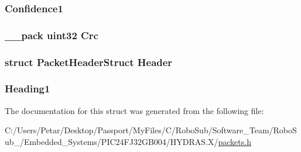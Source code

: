 \subsubsection[{Confidence1}]{ Confidence1}\label{struct_packet_pinger_heading1_get_struct_aa1ecb3c6ee2067686993dc4b6c60d44e}
\hypertarget{struct_packet_pinger_heading1_get_struct_a9ac0191cb1217dfb4164ca0e333de3ac}{}
\subsubsection[{Crc}]{\setlength{\rightskip}{0pt plus 5cm}\+\_\+\+\_\+pack {\bf uint32} Crc}\label{struct_packet_pinger_heading1_get_struct_a9ac0191cb1217dfb4164ca0e333de3ac}
\hypertarget{struct_packet_pinger_heading1_get_struct_ab201af50281aff5ed4f984f994938007}{}
\subsubsection[{Header}]{\setlength{\rightskip}{0pt plus 5cm}struct {\bf Packet\+Header\+Struct} Header}\label{struct_packet_pinger_heading1_get_struct_ab201af50281aff5ed4f984f994938007}
\hypertarget{struct_packet_pinger_heading1_get_struct_aa69558470371823682e756cdede0619b}{}
\subsubsection[{Heading1}]{ Heading1}\label{struct_packet_pinger_heading1_get_struct_aa69558470371823682e756cdede0619b}


The documentation for this struct was generated from the following file\+:\begin{DoxyCompactItemize}
\item 
C\+:/\+Users/\+Petar/\+Desktop/\+Passport/\+My\+Files/\+C/\+Robo\+Sub/\+Software\+\_\+\+Team/\+Robo\+Sub\+\_/\+Embedded\+\_\+\+Systems/\+P\+I\+C24\+F\+J32\+G\+B004/\+H\+Y\+D\+R\+A\+S.\+X/\hyperlink{_h_y_d_r_a_s_8_x_2packets_8h}{packets.\+h}\end{DoxyCompactItemize}
